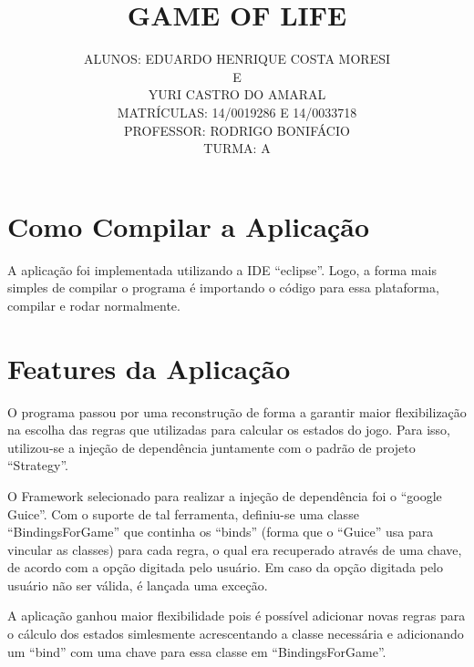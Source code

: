 \documentclass[a4paper,12pt]{article}
\begin{document}
 
\title{GAME OF LIFE}
\author{ALUNOS: EDUARDO HENRIQUE COSTA MORESI \\E\\ YURI CASTRO DO AMARAL \\
MATRÍCULAS: 14/0019286 E 14/0033718 \\PROFESSOR: RODRIGO BONIFÁCIO \\TURMA: A}
\maketitle
\pagebreak[4]

\section{Como Compilar a Aplicação}

\qquad A aplicação foi implementada utilizando a IDE ``eclipse''. Logo, a forma mais simples de compilar o programa é importando o código para essa plataforma, compilar e rodar normalmente.
 
\section{Features da Aplicação}

\qquad O programa passou por uma reconstrução de forma a garantir maior flexibilização na escolha das regras que utilizadas para calcular os estados do jogo. Para isso, utilizou-se a injeção de dependência juntamente com o padrão de projeto ``Strategy''. 

\quad O Framework selecionado para realizar a injeção de dependência foi o ``google Guice''. Com o suporte de tal ferramenta, definiu-se uma classe ``BindingsForGame'' que continha os ``binds'' (forma que o ``Guice'' usa para vincular as classes) para cada regra, o qual era recuperado através de uma chave, de acordo com a opção digitada pelo usuário. Em caso da opção digitada pelo usuário não ser válida, é lançada uma exceção.

\quad A aplicação ganhou maior flexibilidade pois é possível adicionar novas regras para o cálculo dos estados simlesmente acrescentando a classe necessária e adicionando um ``bind'' com uma chave para essa classe em ``BindingsForGame''.
\end{document}
